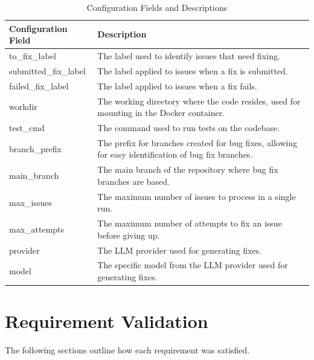 \renewcommand{\arraystretch}{1.5}
\begin{longtable}{@{\extracolsep{\fill}} p{3.5cm} | p{11cm} @{}}
    \caption{Configuration Fields and Descriptions} \label{table:configuration}                                                         \\
    \toprule
    \textbf{Configuration Field} & \textbf{Description}                                                                                 \\
    \midrule
    \endfirsthead

    \bottomrule
    \endfoot

    to\_fix\_label               & The label used to identify issues that need fixing.                                                  \\ \hline
    submitted\_fix\_label        & The label applied to issues when a fix is submitted.                                                 \\ \hline
    failed\_fix\_label           & The label applied to issues when a fix fails.                                                        \\ \hline
    workdir                      & The working directory where the code resides, used for mounting in the Docker container.             \\ \hline
    test\_cmd                    & The command used to run tests on the codebase.                                                       \\ \hline
    branch\_prefix               & The prefix for branches created for bug fixes, allowing for easy identification of bug fix branches. \\ \hline
    main\_branch                 & The main branch of the repository where bug fix branches are based.                                  \\ \hline
    max\_issues                  & The maximum number of issues to process in a single run.                                             \\\hline
    max\_attempts                & The maximum number of attempts to fix an issue before giving up.                                     \\ \hline
    provider                     & The LLM provider used for generating fixes.                                                          \\ \hline
    model                        & The specific model from the LLM provider used for generating fixes.                                  \\
\end{longtable}



\section{Requirement Validation}

The following sections outline how each requirement was satisfied.

